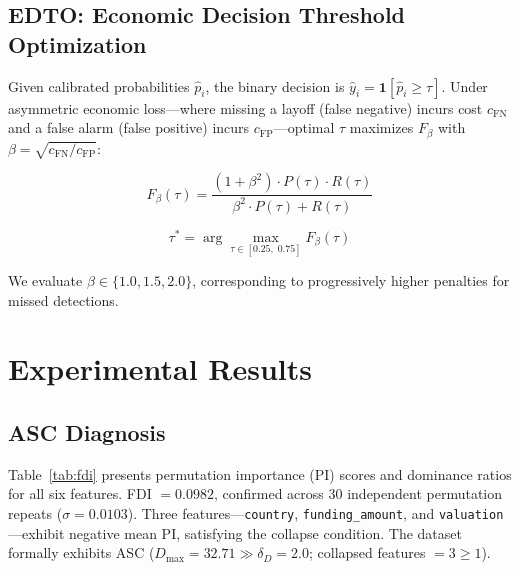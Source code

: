 \documentclass[conference]{IEEEtran}
\begin{document}
\subsection{EDTO: Economic Decision Threshold Optimization}

Given calibrated probabilities $\hat{p}_i$, the binary decision is $\hat{y}_i = \mathbf{1}[\hat{p}_i \geq \tau]$. Under asymmetric economic loss---where missing a layoff (false negative) incurs cost $c_{\text{FN}}$ and a false alarm (false positive) incurs $c_{\text{FP}}$---optimal $\tau$ maximizes $F_\beta$ with $\beta = \sqrt{c_{\text{FN}} / c_{\text{FP}}}$:

\begin{equation}
F_\beta(\tau) = \frac{(1+\beta^2) \cdot P(\tau) \cdot R(\tau)}{\beta^2 \cdot P(\tau) + R(\tau)}
\label{eq:fbeta}
\end{equation}

\begin{equation}
\tau^* = \arg\max_{\tau \in [0.25,\; 0.75]} F_\beta(\tau)
\label{eq:tauopt}
\end{equation}

We evaluate $\beta \in \{1.0, 1.5, 2.0\}$, corresponding to progressively higher penalties for missed detections.

\section{Experimental Results}
\label{sec:results}

\subsection{ASC Diagnosis}

Table~\ref{tab:fdi} presents permutation importance (PI) scores and dominance ratios for all six features. FDI $= 0.0982$, confirmed across 30 independent permutation repeats ($\sigma = 0.0103$). Three features---\texttt{country}, \texttt{funding\_amount}, and \texttt{valuation}---exhibit negative mean PI, satisfying the collapse condition. The dataset formally exhibits ASC ($D_{\max} = 32.71 \gg \delta_D = 2.0$; collapsed features $= 3 \geq 1$).
\end{document}
